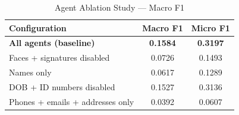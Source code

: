 \begin{table}[h]\centering
\caption{Agent Ablation Study — Macro F1}
\label{tab:ablation}
\begin{tabular}{lcc}
\toprule
Configuration & Macro F1 & Micro F1 \\
\midrule
\textbf{All agents (baseline)} & \textbf{0.1584} & \textbf{0.3197} \\
Faces + signatures disabled & 0.0726 & 0.1493 \\
Names only & 0.0617 & 0.1289 \\
DOB + ID numbers disabled & 0.1527 & 0.3136 \\
Phones + emails + addresses only & 0.0392 & 0.0607 \\
\bottomrule
\end{tabular}
\end{table}